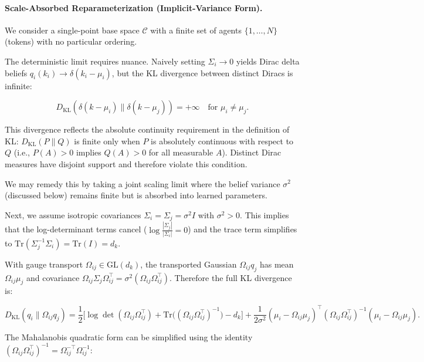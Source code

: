 \documentclass[twoside,11pt]{article}
\begin{document}
\paragraph{Scale-Absorbed Reparameterization (Implicit-Variance Form).}

We consider a single-point base space $\mathcal{C}$ with a finite set of agents $\{1,\dots,N\}$ (tokens) with no particular ordering. 

The deterministic limit requires nuance. Naively setting $\Sigma_i \to 0$ yields Dirac delta beliefs $q_i(k_i) \to \delta(k_i - \mu_i)$, but the KL divergence between distinct Diracs is infinite:

\begin{equation}
D_{\mathrm{KL}}(\delta(k - \mu_i) \| \delta(k - \mu_j)) = +\infty \quad \text{for } \mu_i \neq \mu_j.
\end{equation}

This divergence reflects the absolute continuity requirement in the definition of KL: $D_{\mathrm{KL}}(P \| Q)$ is finite only when $P$ is absolutely continuous with respect to $Q$ (i.e., $P(A) > 0$ implies $Q(A) > 0$ for all measurable $A$). Distinct Dirac measures have disjoint support and therefore violate this condition.

We may remedy this by taking a joint scaling limit where the belief variance $\sigma^2$ (discussed below) remains finite but is absorbed into learned parameters.

Next, we assume isotropic covariances $\Sigma_i = \Sigma_j = \sigma^2 I$ with $\sigma^2 > 0$. This implies that the log-determinant terms cancel ($\log\frac{|\Sigma_j|}{|\Sigma_i|} = 0$) and the trace term simplifies to $\mathrm{Tr}(\Sigma_j^{-1}\Sigma_i) = \mathrm{Tr}(I) = d_k$.

With gauge transport $\Omega_{ij} \in \mathrm{GL}(d_k)$, the transported Gaussian $\Omega_{ij}q_j$ has mean $\Omega_{ij}\mu_j$ and covariance $\Omega_{ij}\Sigma_j\Omega_{ij}^\top = \sigma^2(\Omega_{ij}\Omega_{ij}^\top)$. Therefore the full KL divergence is:

\begin{equation}
D_{\mathrm{KL}}(q_i \| \Omega_{ij}q_j) = \frac{1}{2}\Big[\log\det(\Omega_{ij}\Omega_{ij}^\top) + \mathrm{Tr}\big((\Omega_{ij}\Omega_{ij}^\top)^{-1}\big) - d_k\Big] + \frac{1}{2\sigma^2}(\mu_i - \Omega_{ij}\mu_j)^\top(\Omega_{ij}\Omega_{ij}^\top)^{-1}(\mu_i - \Omega_{ij}\mu_j).
\end{equation}

The Mahalanobis quadratic form can be simplified using the identity $(\Omega_{ij}\Omega_{ij}^\top)^{-1} = \Omega_{ij}^{-\top}\Omega_{ij}^{-1}$:
\end{document}
